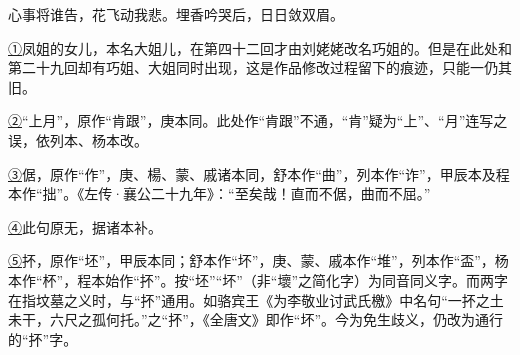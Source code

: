 {心事将谁告，花飞动我悲。埋香吟哭后，日日敛双眉。}

{\href{../Text/part0031_split_000.html\#navto_1_a}{①}凤姐的女儿，本名大姐儿，在第四十二回才由刘姥姥改名巧姐的。但是在此处和第二十九回却有巧姐、大姐同时出现，这是作品修改过程留下的痕迹，只能一仍其旧。}

{\href{../Text/part0031_split_000.html\#navto_2_a}{②}``上月''，原作``肯跟''，庚本同。此处作``肯跟''不通，``肯''疑为``上''、``月''连写之误，依列本、杨本改。}

{\href{../Text/part0031_split_000.html\#navto_3_a}{③}倨，原作``作''，庚、楊、蒙、戚诸本同，舒本作``曲''，列本作``诈''，甲辰本及程本作``拙''。《左传·襄公二十九年》：``至矣哉！直而不倨，曲而不屈。''}

{\href{../Text/part0031_split_000.html\#navto_4_a}{④}此句原无，据诸本补。}

{\href{../Text/part0031_split_000.html\#navto_5_a}{⑤}抔，原作``坯''，甲辰本同；舒本作``坏''，庚、蒙、戚本作``堆''，列本作``盃''，杨本作``杯''，程本始作``抔''。按``坯''``坏''（非``壞''之简化字）为同音同义字。而两字在指坟墓之义时，与``抔''通用。如骆宾王《为李敬业讨武氏檄》中名句``一抔之土未干，六尺之孤何托。''之``抔''，《全唐文》即作``坏''。今为免生歧义，仍改为通行的``抔''字。}
